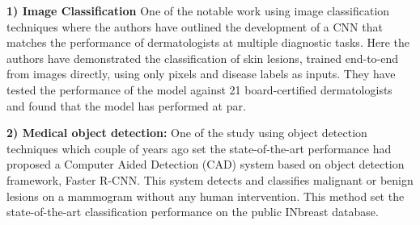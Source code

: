 \documentclass[10pt,twocolumn,letterpaper]{article}
\begin{document}
\textbf{1) Image Classification}
One of the notable work \cite{Esteva:1476-4687} using image classification techniques where the authors have outlined the development of a CNN that matches the performance of dermatologists at multiple diagnostic tasks. Here the authors have demonstrated the classification of skin lesions, trained end-to-end from images directly, using only pixels and disease labels as inputs. They have tested the performance of the model against 21 board-certified dermatologists and found that the model has performed at par.



\textbf{2) Medical object detection:}
One of the study \cite{ribli2018detecting} using object detection techniques which couple of years ago set the state-of-the-art performance had proposed a Computer Aided Detection (CAD) system based on object detection framework, Faster R-CNN. This system detects and classifies malignant or benign lesions on a mammogram without any human intervention. This method set the state-of-the-art classification performance on the public INbreast database. 
\end{document}
